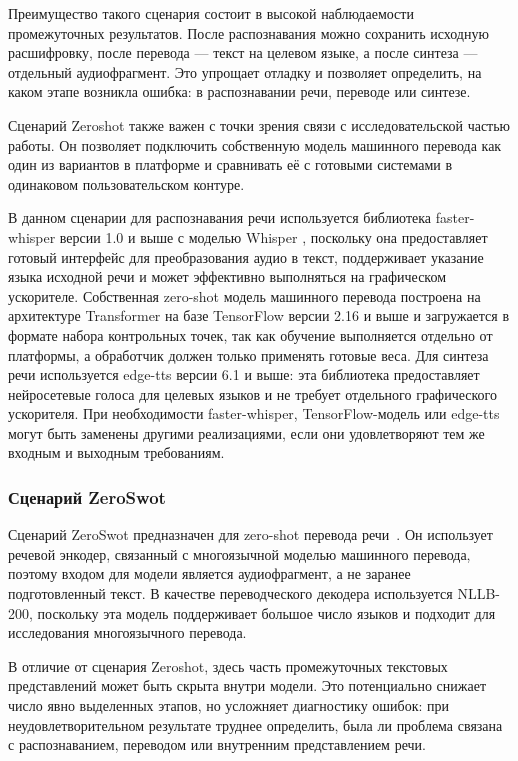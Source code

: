 \documentclass[a4paper,article,14pt]{extarticle}
\begin{document}
Преимущество такого сценария состоит в высокой наблюдаемости промежуточных результатов. После распознавания можно сохранить исходную расшифровку, после перевода --- текст на целевом языке, а после синтеза --- отдельный аудиофрагмент. Это упрощает отладку и позволяет определить, на каком этапе возникла ошибка: в распознавании речи, переводе или синтезе.

Сценарий Zeroshot также важен с точки зрения связи с исследовательской частью работы. Он позволяет подключить собственную модель машинного перевода как один из вариантов в платформе и сравнивать её с готовыми системами в одинаковом пользовательском контуре.

В данном сценарии для распознавания речи используется библиотека faster-whisper версии 1.0 и выше с моделью \foreignlanguage{english}{Whisper} \cite{Whisper}, поскольку она предоставляет готовый интерфейс для преобразования аудио в текст, поддерживает указание языка исходной речи и может эффективно выполняться на графическом ускорителе. Собственная zero-shot модель машинного перевода построена на архитектуре Transformer на базе TensorFlow версии 2.16 и выше и загружается в формате набора контрольных точек, так как обучение выполняется отдельно от платформы, а обработчик должен только применять готовые веса. Для синтеза речи используется edge-tts версии 6.1 и выше: эта библиотека предоставляет нейросетевые голоса для целевых языков и не требует отдельного графического ускорителя. При необходимости faster-whisper, TensorFlow-модель или edge-tts могут быть заменены другими реализациями, если они удовлетворяют тем же входным и выходным требованиям.

\subsubsection{Сценарий ZeroSwot}

Сценарий ZeroSwot предназначен для zero-shot перевода речи~\cite{ZeroSwot}. Он использует речевой энкодер, связанный с многоязычной моделью машинного перевода, поэтому входом для модели является аудиофрагмент, а не заранее подготовленный текст. В качестве переводческого декодера используется NLLB-200, поскольку эта модель поддерживает большое число языков и подходит для исследования многоязычного перевода.

В отличие от сценария Zeroshot, здесь часть промежуточных текстовых представлений может быть скрыта внутри модели. Это потенциально снижает число явно выделенных этапов, но усложняет диагностику ошибок: при неудовлетворительном результате труднее определить, была ли проблема связана с распознаванием, переводом или внутренним представлением речи.
\end{document}
